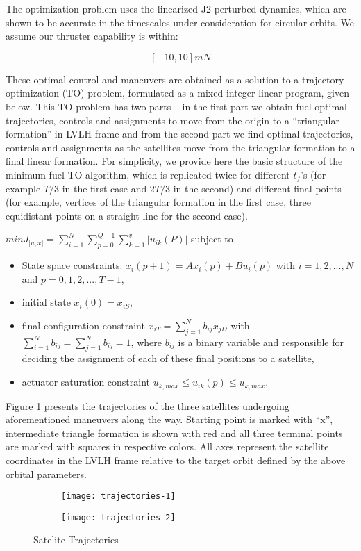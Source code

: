 The optimization problem uses the linearized J2-perturbed dynamics,
which are shown to be accurate in the timescales under consideration
for circular orbits. We assume our thruster capability is within:

\[[-10, 10] mN\]

These optimal control and maneuvers are obtained as a solution to a
trajectory optimization (TO) problem, formulated as a mixed-integer
linear program, given below. This TO problem has two parts – in the
first part we obtain fuel optimal trajectories, controls and
assignments to move from the origin to a ``triangular formation'' in
LVLH frame and from the second part we find optimal trajectories,
controls and assignments as the satellites move from the triangular
formation to a final linear formation. For simplicity, we provide here
the basic structure of the minimum fuel TO algorithm, which is
replicated twice for different $t_f$'s (for example $T/3$ in the first
case and $2T/3$ in the second) and different final points (for
example, vertices of the triangular formation in the first case, three
equidistant points on a straight line for the second case).

$min J_{|u,x|} = \sum_{i=1}^{N} \sum_{p=0}^{Q-1} \sum_{k=1}^{v} | u_{ik} (P)|$
subject to
\begin{itemize}
\item State space constraints:
  $x_i(p+1) = Ax_i(p)+Bu_i(p)$ with $i = 1,2,...,N$ and $p = 0,1,2,...,T-1$,
\item initial state $x_i(0) = x_{iS}$,
\item final configuration constraint
  $x_{iT} = \sum_{j=1}^{N}b_{ij}x_{jD}$
  with $\sum_{i=1}^{N}b_{ij} = \sum_{j=1}^{N}b_{ij} = 1$,
  where $b_{ij}$
  is a binary variable and responsible for deciding the assignment of
  each of these final positions to a satellite,
\item actuator saturation constraint $u_{k,max} \leq u_{ik}(p) \leq u_{k,max}$.
\end{itemize}

Figure \ref{fig:trajectories} presents the trajectories of the three
satellites undergoing aforementioned maneuvers along the way. Starting
point is marked with ``x'', intermediate triangle formation is shown
with red and all three terminal points are marked with squares in
respective colors. All axes represent the satellite coordinates in the
LVLH frame relative to the target orbit defined by the above orbital
parameters.

\begin{figure}
\centering

\begin{subfigure}{0.4\textwidth}
\texttt{[image: trajectories-1]}
\end{subfigure}

\hfill

\begin{subfigure}{0.4\textwidth}
\texttt{[image: trajectories-2]}
\end{subfigure}

\caption{Satelite Trajectories}
\label{fig:trajectories}
\end{figure}

